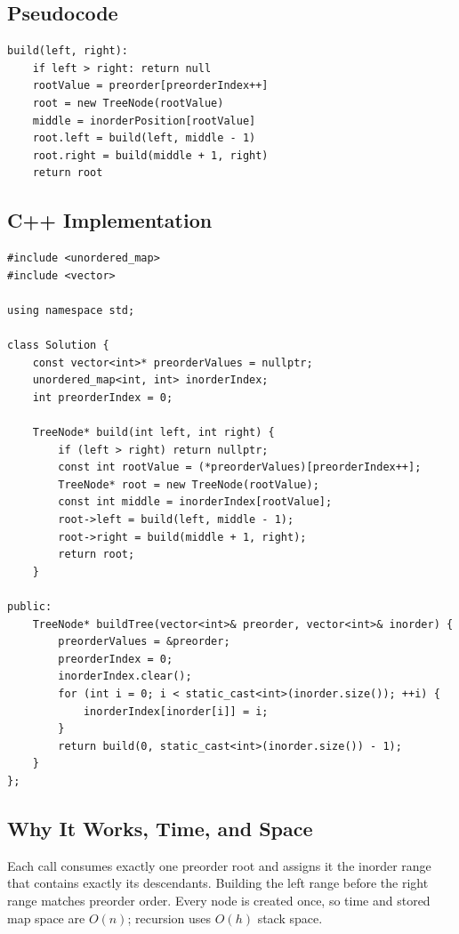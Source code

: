 \subsection{Pseudocode}
\begin{lstlisting}[style=pseudocode]
build(left, right):
    if left > right: return null
    rootValue = preorder[preorderIndex++]
    root = new TreeNode(rootValue)
    middle = inorderPosition[rootValue]
    root.left = build(left, middle - 1)
    root.right = build(middle + 1, right)
    return root
\end{lstlisting}

\subsection{C++ Implementation}
\begin{lstlisting}[style=compactcode,caption={Complete C++ solution: Construct Binary Tree}]
#include <unordered_map>
#include <vector>

using namespace std;

class Solution {
    const vector<int>* preorderValues = nullptr;
    unordered_map<int, int> inorderIndex;
    int preorderIndex = 0;

    TreeNode* build(int left, int right) {
        if (left > right) return nullptr;
        const int rootValue = (*preorderValues)[preorderIndex++];
        TreeNode* root = new TreeNode(rootValue);
        const int middle = inorderIndex[rootValue];
        root->left = build(left, middle - 1);
        root->right = build(middle + 1, right);
        return root;
    }

public:
    TreeNode* buildTree(vector<int>& preorder, vector<int>& inorder) {
        preorderValues = &preorder;
        preorderIndex = 0;
        inorderIndex.clear();
        for (int i = 0; i < static_cast<int>(inorder.size()); ++i) {
            inorderIndex[inorder[i]] = i;
        }
        return build(0, static_cast<int>(inorder.size()) - 1);
    }
};
\end{lstlisting}
\judgeclassnote

\subsection{Why It Works, Time, and Space}
Each call consumes exactly one preorder root and assigns it the inorder range
that contains exactly its descendants. Building the left range before the
right range matches preorder order. Every node is created once, so time and
stored map space are \(O(n)\); recursion uses \(O(h)\) stack space.

